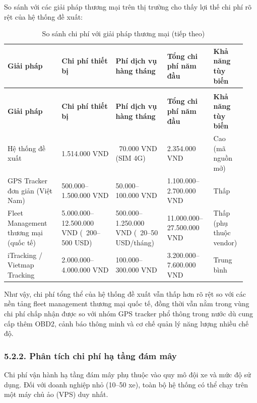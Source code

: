 \documentclass[a4paper]{extarticle}
\newcommand{\thesissettableid}[2]{%
  \renewcommand{\thetable}{#1}%
  \renewcommand{\theHtable}{#2}%
}
\begin{document}
So sánh với các giải pháp thương mại trên thị trường cho thấy lợi thế
chi phí rõ rệt của hệ thống đề xuất:


{\thesissettableid{5.5}{tab-ch5-so-sanh-chi-phi-voi-giai-phap-thuong-mai}
\def\LTcaptype{table}
\begin{longtable}{|L{0.215\linewidth}|L{0.213\linewidth}|L{0.205\linewidth}|L{0.183\linewidth}|L{0.129\linewidth}|}
\caption{So sánh chi phí với giải pháp thương mại}\label{tab:ch5-so-sanh-chi-phi-voi-giai-phap-thuong-mai}\\
\hline \textbf{Giải pháp} & \textbf{Chi phí thiết bị} & \textbf{Phí dịch vụ hàng tháng} & \textbf{Tổng chi phí năm
đầu} & \textbf{Khả năng tùy biến} \\
\hline
\endfirsthead
\caption[]{So sánh chi phí với giải pháp thương mại (tiếp theo)}\\
\hline \textbf{Giải pháp} & \textbf{Chi phí thiết bị} & \textbf{Phí dịch vụ hàng tháng} & \textbf{Tổng chi phí năm
đầu} & \textbf{Khả năng tùy biến} \\
\hline
\endhead
\hline
\endfoot
\endlastfoot
Hệ thống đề xuất & 1.514.000 VND & ~70.000 VND
(SIM 4G) & 2.354.000 VND & Cao (mã nguồn mở) \\\hline
GPS Tracker đơn giản (Việt Nam) & 500.000--1.500.000 VND &
50.000--100.000 VND & 1.100.000--2.700.000 VND & Thấp \\\hline
Fleet Management thương mại (quốc tế) & 5.000.000--12.500.000 VND
(~200--500 USD) & 500.000--1.250.000 VND
(~20--50 USD/tháng) & 11.000.000--27.500.000 VND & Thấp
(phụ thuộc vendor) \\\hline
iTracking / Vietmap Tracking & 2.000.000--4.000.000 VND &
100.000--300.000 VND & 3.200.000--7.600.000 VND & Trung bình \\\hline
\end{longtable}
}


Như vậy, chi phí tổng thể của hệ thống đề xuất vẫn thấp hơn rõ rệt so
với các nền tảng fleet management thương mại quốc tế, đồng thời vẫn nằm
trong vùng chi phí chấp nhận được so với nhóm GPS tracker phổ thông
trong nước dù cung cấp thêm OBD2, cảnh báo thông minh và cơ chế quản lý
năng lượng nhiều chế độ.

\subsubsection{5.2.2. Phân tích chi phí hạ tầng đám
mây}\label{522-phuxe2n-tuxedch-chi-phuxed-hux1ea1-tux1ea7ng-ux111uxe1m-muxe2y}

Chi phí vận hành hạ tầng đám mây phụ thuộc vào quy mô đội xe và mức độ
sử dụng. Đối với doanh nghiệp nhỏ (10--50 xe), toàn bộ hệ thống có thể
chạy trên một máy chủ ảo (VPS) duy nhất.
\end{document}
